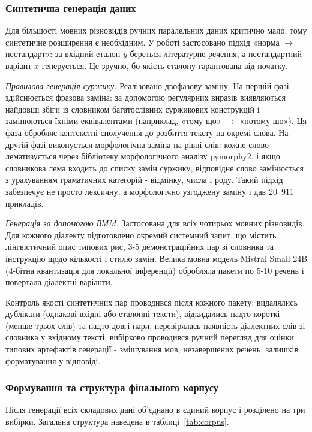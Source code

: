 \documentclass[14pt]{extarticle}
\begin{document}
\subsubsection{Синтетична генерація даних}

Для більшості мовних різновидів ручних паралельних даних критично мало, тому синтетичне розширення є необхідним. У роботі застосовано підхід «норма $\to$ нестандарт»: за вхідний еталон $y$ береться літературне речення, а нестандартний варіант $x$ генерується. Це зручно, бо якість еталону гарантована від початку.

\textit{Правилова генерація суржику.} Реалізовано двофазову заміну. На першій фазі здійснюється фразова заміна: за допомогою регулярних виразів виявляються найдовші збіги із словником багатослівних суржикових конструкцій і замінюються їхніми еквівалентами (наприклад, «тому що» $\to$ «потому шо»). Ця фаза обробляє контекстні сполучення до розбиття тексту на окремі слова. На другій фазі виконується морфологічна заміна на рівні слів: кожне слово лематизується через бібліотеку морфологічного аналізу pymorphy2, і якщо словникова лема входить до списку замін суржику, відповідне слово замінюється з урахуванням граматичних категорій - відмінку, числа і роду. Такий підхід забезпечує не просто лексичну, а морфологічно узгоджену заміну і дав 20~911 прикладів.

\textit{Генерація за допомогою ВМM.} Застосована для всіх чотирьох мовних різновидів. Для кожного діалекту підготовлено окремий системний запит, що містить лінгвістичний опис типових рис, 3-5 демонстраційних пар зі словника та інструкцію щодо кількості і стилю замін. Велика мовна модель Mistral Small 24B (4-бітна квантизація для локальної інференції) обробляла пакети по 5-10 речень і повертала діалектні варіанти.

Контроль якості синтетичних пар проводився після кожного пакету: видалялись дублікати (однакові вхідні або еталонні тексти), відкидались надто короткі (менше трьох слів) та надто довгі пари, перевірялась наявність діалектних слів зі словника у вхідному тексті, вибірково проводився ручний перегляд для оцінки типових артефактів генерації - змішування мов, незавершених речень, залишків форматування у відповіді.

\subsubsection{Формування та структура фінального корпусу}

Після генерації всіх складових дані об'єднано в єдиний корпус і розділено на три вибірки. Загальна структура наведена в таблиці~\ref{tab:corpus}.
\end{document}
